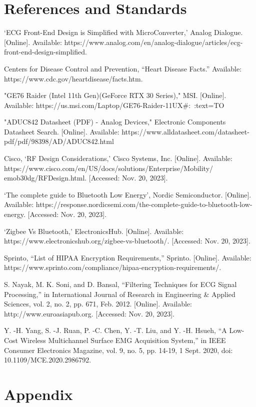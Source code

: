 \documentclass{article}
\begin{document}
\section{References and Standards}
\begin{thebibliography}{9}
        
    `ECG Front-End Design is Simplified with MicroConverter,' Analog Dialogue. [Online]. Available: https://www.analog.com/en/analog-dialogue/articles/ecg-front-end-design-simplified.
    
    Centers for Disease Control and Prevention, ``Heart Disease Facts.'' Available: https://www.cdc.gov/heartdisease/facts.htm.
    
    "GE76 Raider (Intel 11th Gen)(GeForce RTX 30 Series)," MSI. [Online]. Available: https://us.msi.com/Laptop/GE76-Raider-11UX#:~:text=TO%

    "ADUC842 Datasheet (PDF) - Analog Devices," Electronic Components Datasheet Search. [Online]. Available: https://www.alldatasheet.com/datasheet-pdf/pdf/98398/AD/ADUC842.html
    
    Cisco, `RF Design Considerations,' Cisco Systems, Inc. [Online]. Available: https://www.cisco.com/en/US/docs/solutions/Enterprise/Mobility/
    emob30dg/RFDesign.html. [Accessed: Nov. 20, 2023].
    
    `The complete guide to Bluetooth Low Energy', Nordic Semiconductor. [Online]. Available: https://response.nordicsemi.com/the-complete-guide-to-bluetooth-low-energy. [Accessed: Nov. 20, 2023].
    
    `Zigbee Vs Bluetooth,' ElectronicsHub. [Online]. Available: https://www.electronicshub.org/zigbee-vs-bluetooth/. [Accessed: Nov. 20, 2023].

    Sprinto, ``List of HIPAA Encryption Requirements,'' Sprinto. [Online]. Available: https://www.sprinto.com/compliance/hipaa-encryption-requirements/.

    S. Nayak, M. K. Soni, and D. Bansal, ``Filtering Techniques for ECG Signal Processing,'' in International Journal of Research in Engineering \& Applied Sciences, vol. 2, no. 2, pp. 671, Feb. 2012. [Online]. Available: http://www.euroasiapub.org. [Accessed: Nov. 20, 2023].
    
    Y. -H. Yang, S. -J. Ruan, P. -C. Chen, Y. -T. Liu, and Y. -H. Hsueh, ``A Low-Cost Wireless Multichannel Surface EMG Acquisition System,'' in IEEE Consumer Electronics Magazine, vol. 9, no. 5, pp. 14-19, 1 Sept. 2020, doi: 10.1109/MCE.2020.2986792.
    

\end{thebibliography}  


\section{Appendix}
\end{document}
